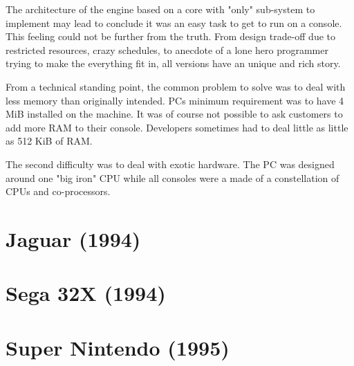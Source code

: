 \par
The architecture of the engine based on a core with "only" sub-system to implement may lead to conclude it was an easy task to get \doom to run on a console. This feeling could not be further from the truth. From design trade-off due to restricted resources, crazy schedules, to anecdote of a lone hero programmer trying to make the everything fit in, all versions have an unique and rich story.\\
\par
From a technical standing point, the common problem to solve was to deal with less memory than originally intended. PCs minimum requirement was to have 4 MiB installed on the machine. It was of course not possible to ask customers to add more RAM to their console. Developers sometimes had to deal little as little as 512 KiB of RAM.\\
\par
The second difficulty was to deal with exotic hardware. The PC was designed around one "big iron" CPU while all consoles were a made of a constellation of CPUs and co-processors.












\section{Jaguar (1994)}
 


















\section{Sega 32X (1994)}
 






\section{Super Nintendo (1995)}









